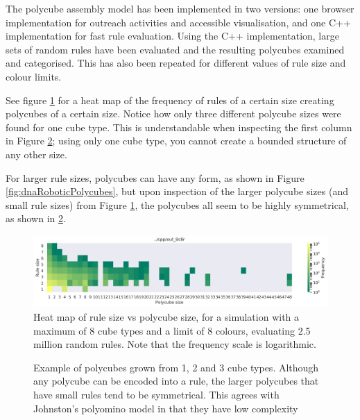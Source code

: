 The polycube assembly model has been implemented in two versions: one browser implementation for outreach activities and accessible visualisation, and one C++ implementation for fast rule evaluation. Using the C++ implementation, large sets of random rules have been evaluated and the resulting polycubes examined and categorised. This has also been repeated for different values of rule size and colour limits.

See figure \ref{fig:rs_vs_ps} for a heat map of the frequency of rules of a certain size creating polycubes of a certain size. Notice how only three different polycube sizes were found for one cube type. This is understandable when inspecting the first column in Figure \ref{fig:poly_examples}; using only one cube type, you cannot create a bounded structure of any other size.

For larger rule sizes, polycubes can have any form, as shown in Figure \ref{fig:dnaRoboticPolycubes}, but upon inspection of the larger polycube sizes (and small rule sizes) from Figure \ref{fig:rs_vs_ps}, the polycubes all seem to be highly symmetrical, as shown in \ref{fig:poly_examples}.


\begin{figure}
\centering\includegraphics[width=\textwidth]{figures/rs_vs_ps_8c8r.png}
\caption{Heat map of rule size vs polycube size, for a simulation with a maximum of 8 cube types and a limit of 8 colours, evaluating 2.5 million random rules. Note that the frequency scale is logarithmic.}
\label{fig:rs_vs_ps}\end{figure}

\begin{figure}
\caption{Example of polycubes grown from 1, 2 and 3 cube types. Although any polycube can be encoded into a rule, the larger polycubes that have small rules tend to be symmetrical. This agrees with Johnston's polyomino model in that they have low complexity}
\label{fig:poly_examples}\end{figure}

